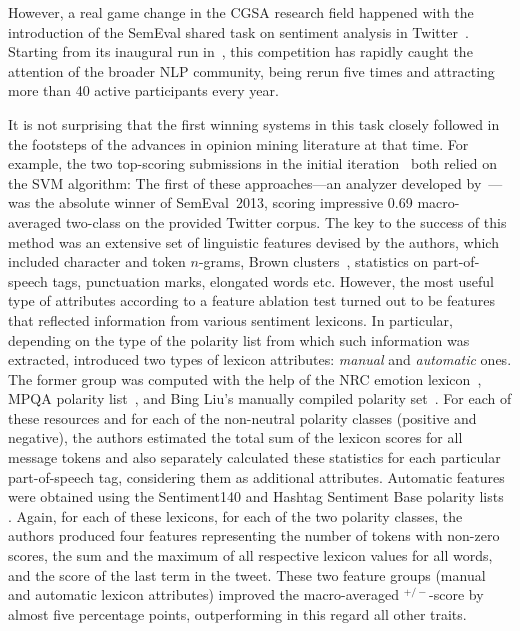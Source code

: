 However, a real game change in the CGSA research field happened with
the introduction of the SemEval shared task on sentiment analysis in
Twitter~\cite{Nakov:13}.  Starting from its inaugural run
in~\citeyear{Nakov:13}, this competition has rapidly caught the
attention of the broader NLP community, being rerun five times and
attracting more than 40 active participants every year.

It is not surprising that the first winning systems in this task
closely followed in the footsteps of the advances in opinion mining
literature at that time.  For example, the two top-scoring submissions
in the initial iteration~\cite{Mohammad:13,Guenther:13} both relied on
the SVM algorithm: The first of these approaches---an analyzer
developed by~\citet{Mohammad:13}---was the absolute winner of
SemEval~2013, scoring impressive 0.69 macro-averaged two-class \F{} on
the provided Twitter corpus.  The key to the success of this method
was an extensive set of linguistic features devised by the authors,
which included character and token $n$-grams, Brown
clusters~\cite{Brown:92}, statistics on part-of-speech tags,
punctuation marks, elongated words etc.  However, the most useful type
of attributes according to a feature ablation test turned out to be
features that reflected information from various sentiment lexicons.
In particular, depending on the type of the polarity list from which
such information was extracted, \citeauthor{Mohammad:13} introduced
two types of lexicon attributes: \emph{manual} and \emph{automatic}
ones.  The former group was computed with the help of the NRC emotion
lexicon~\cite{Mohammad:13a}, MPQA polarity list~\cite{Wilson:05}, and
Bing Liu's manually compiled polarity set~\cite{Hu:04}.  For each of
these resources and for each of the non-neutral polarity classes
(positive and negative), the authors estimated the total sum of the
lexicon scores for all message tokens and also separately calculated
these statistics for each particular part-of-speech tag, considering
them as additional attributes.  Automatic features were obtained using
the Sentiment140 and Hashtag Sentiment Base polarity lists
\cite{Kiritchenko:14}.  Again, for each of these lexicons, for each of
the two polarity classes, the authors produced four features
representing the number of tokens with non-zero scores, the sum and
the maximum of all respective lexicon values for all words, and the
score of the last term in the tweet.  These two feature groups (manual
and automatic lexicon attributes) improved the macro-averaged
\F{}$^{+/-}$-score by almost five percentage points, outperforming in
this regard all other traits.

